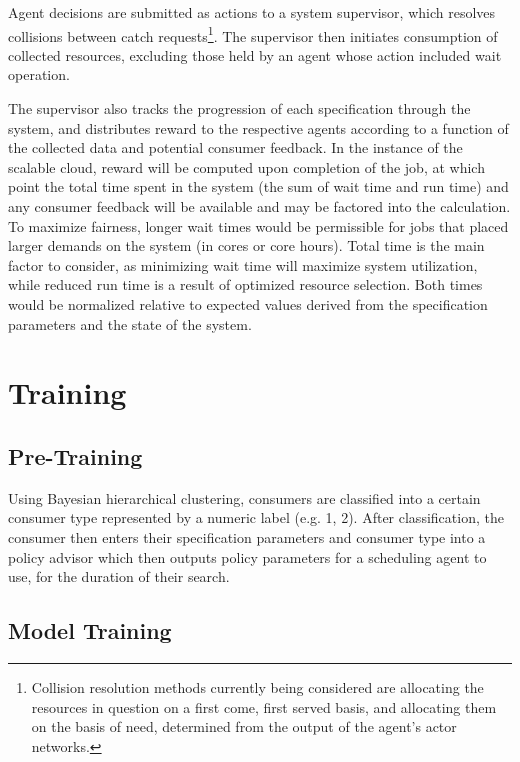 \documentclass{article}
\theoremstyle{definition}
\theoremstyle{remark}
\begin{document}
		Agent decisions are submitted as actions to a system supervisor, which resolves collisions between catch requests\footnote{Collision resolution methods currently being considered are allocating the resources in question on a first come, first served basis, and allocating them on the basis of need, determined from the output of the agent's actor networks.}. The supervisor then initiates consumption of collected resources, excluding those held by an agent whose action included wait operation.

		The supervisor also tracks the progression of each specification through the system, and distributes reward to the respective agents according to a function of the collected data and potential consumer feedback. In the instance of the scalable cloud, reward will be computed upon completion of the job, at which point the total time spent in the system (the sum of wait time and run time) and any consumer feedback will be available and may be factored into the calculation. To maximize fairness, longer wait times would be permissible for jobs that placed larger demands on the system (in cores or core hours). Total time is the main factor to consider, as minimizing wait time will maximize system utilization, while reduced run time is a result of optimized resource selection. Both times would be normalized relative to expected values derived from the specification parameters and the state of the system.

	\section{Training}

		\subsection{Pre-Training}

		Using Bayesian hierarchical clustering, consumers are classified into a certain consumer type represented by a numeric label (e.g. 1, 2). After classification, the consumer then enters their specification parameters and consumer type into a policy advisor which then outputs policy parameters for a scheduling agent to use, for the duration of their search.

		\subsection{Model Training}
\end{document}
